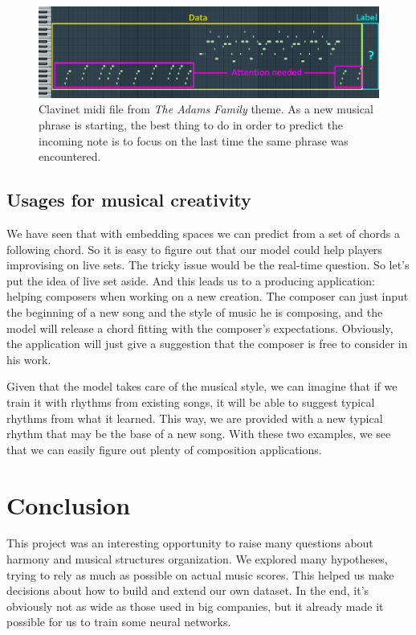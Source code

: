 \documentclass{article}
\begin{document}
\begin{figure}[H]
\centering
\includegraphics[width =1\textwidth]{attention.png}
\caption{Clavinet midi file from \textit{The Adams Family} theme.
As a new musical phrase is starting, the best thing to do in order to predict the incoming note is to focus on the last time the same phrase was encountered.}
\label{attention_adams}
\end{figure}

\subsection{Usages for musical creativity}
We have seen that with embedding spaces we can predict from a set of chords a following chord. So it is easy to figure out that our model could help players improvising on live sets. The tricky issue would be the real-time question. So let’s put the idea of live set aside. And this leads us to a producing application: helping composers when working on a new creation. The composer can just input the beginning of a new song and the style of music he is composing, and the model will release a chord fitting with the composer’s expectations. Obviously, the application will just give a suggestion that the composer is free to consider in his work.

Given that the model takes care of the musical style, we can imagine that if we train it with rhythms from existing songs, it will be able to suggest typical rhythms from what it learned. This way, we are provided with a new typical rhythm that may be the base of a new song. With these two examples, we see that we can easily figure out plenty of composition applications.

\section{Conclusion}

This project was an interesting opportunity to raise many questions about harmony and musical structures organization. We explored many hypotheses, trying to rely as much as possible on actual music scores. This helped us make decisions about how to build and extend our own dataset. In the end, it's obviously not as wide as those used in big companies, but it already made it possible for us to train some neural networks. 
\end{document}
